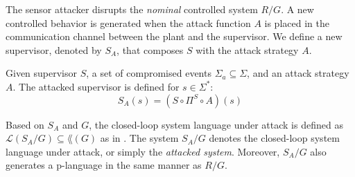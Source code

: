 The sensor attacker disrupts the \emph{nominal} controlled system $R/G$.
A new controlled behavior is generated when the attack function $A$ is placed in the communication channel between the plant and the supervisor.
We define a new supervisor, denoted by $S_A$, that composes $S$ with the attack strategy $A$.
\begin{definition}
Given supervisor $S$, a set of compromised events $\Sigma_a\subseteq \Sigma$, and an attack strategy $A$. The attacked supervisor is defined for $s\in \Sigma^*$: 
\begin{equation}
S_A(s) = (S\circ \Pi^S\circ A)(s)
\end{equation}
\end{definition}
Based on $S_A$ and $G$, the closed-loop system language under attack is defined as $\mathcal{L}(S_A/G)\subseteq \lang(G)$ as in \citep{Lafortune:2021}. 
The system $S_A/G$ denotes the closed-loop system language under attack, or simply the \emph{attacked system}.
Moreover, $S_A/G$ also generates a p-language in the same manner as $R/G$.

